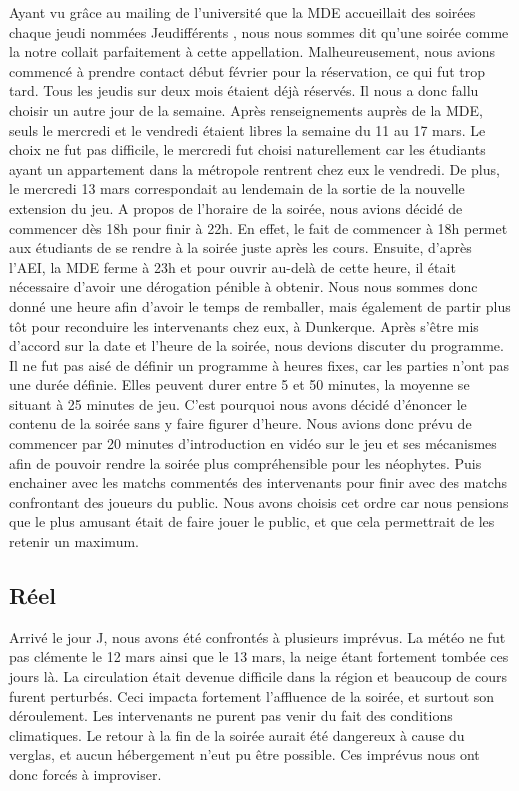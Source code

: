 Ayant vu grâce au mailing de l’université que la MDE accueillait des soirées chaque jeudi
nommées \og Jeudifférents \fg{}, nous nous sommes dit qu’une soirée comme la notre collait
parfaitement à cette appellation. Malheureusement, nous avions commencé à prendre contact
début février pour la réservation, ce qui fut trop tard. Tous les jeudis sur deux mois étaient
déjà réservés.
Il nous a donc fallu choisir un autre jour de la semaine. Après renseignements auprès de la
MDE, seuls le mercredi et le vendredi étaient libres la semaine du 11 au 17 mars. Le choix ne
fut pas difficile, le mercredi fut choisi naturellement car les étudiants ayant un appartement
dans la métropole rentrent chez eux le vendredi. De plus, le mercredi 13 mars correspondait
au lendemain de la sortie de la nouvelle extension du jeu.
A propos de l’horaire de la soirée, nous avions décidé de commencer dès 18h pour finir à
22h. En effet, le fait de commencer à 18h permet aux étudiants de se rendre à la soirée juste
après les cours. Ensuite, d’après l’AEI, la MDE ferme à 23h et pour ouvrir au-delà de cette
heure, il était nécessaire d’avoir une dérogation pénible à obtenir. Nous nous sommes donc
donné une heure afin d’avoir le temps de remballer, mais également de partir plus tôt pour
reconduire les intervenants chez eux, à Dunkerque.
Après s’être mis d’accord sur la date et l’heure de la soirée, nous devions discuter du
programme.
Il ne fut pas aisé de définir un programme à heures fixes, car les parties n’ont pas une durée
définie. Elles peuvent durer entre 5 et 50 minutes, la moyenne se situant à 25 minutes de jeu.
C’est pourquoi nous avons décidé d’énoncer le contenu de la soirée sans y faire figurer
d’heure.
Nous avions donc prévu de commencer par 20 minutes d’introduction en vidéo sur le jeu et
ses mécanismes afin de pouvoir rendre la soirée plus compréhensible pour les néophytes.
Puis enchainer avec les matchs commentés des intervenants pour finir avec des matchs
confrontant des joueurs du public. Nous avons choisis cet ordre car nous pensions que le plus
amusant était de faire jouer le public, et que cela permettrait de les retenir un maximum.

\subsection{Réel}%
\label{sub:reel}

Arrivé le jour J, nous avons été confrontés à plusieurs imprévus.
La météo ne fut pas clémente le 12 mars ainsi que le 13 mars, la neige étant fortement
tombée ces jours là. La circulation était devenue difficile dans la région et beaucoup de cours
furent perturbés.
Ceci impacta fortement l’affluence de la soirée, et surtout son déroulement. Les intervenants
ne purent pas venir du fait des conditions climatiques. Le retour à la fin de la soirée aurait été
dangereux à cause du verglas, et aucun hébergement n’eut pu être possible.
Ces imprévus nous ont donc forcés à improviser.

